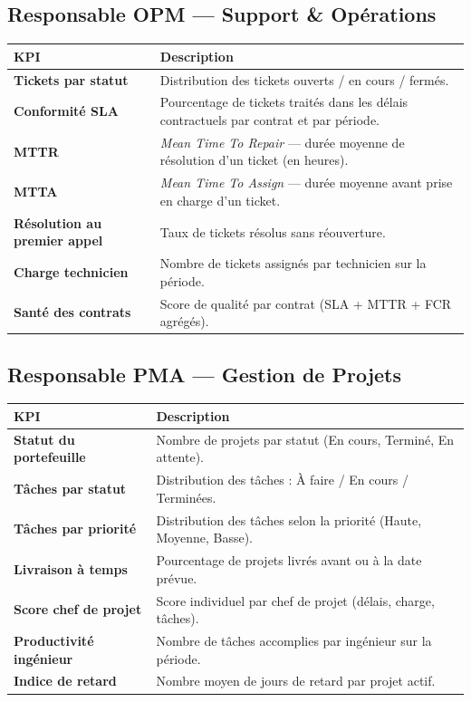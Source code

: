 \documentclass[a4paper,12pt]{article}
\begin{document}
\subsection{Responsable OPM — Support \& Opérations}

\begin{longtable}{>{\bfseries}p{5cm} p{9.5cm}}
\toprule
KPI & Description \\
\midrule
\endhead
Tickets par statut            & Distribution des tickets ouverts / en cours / fermés. \\
Conformité SLA                & Pourcentage de tickets traités dans les délais contractuels
                                 par contrat et par période. \\
MTTR                          & \textit{Mean Time To Repair} — durée moyenne de résolution
                                 d'un ticket (en heures). \\
MTTA                          & \textit{Mean Time To Assign} — durée moyenne avant
                                 prise en charge d'un ticket. \\
Résolution au premier appel   & Taux de tickets résolus sans réouverture. \\
Charge technicien             & Nombre de tickets assignés par technicien sur la période. \\
Santé des contrats            & Score de qualité par contrat (SLA + MTTR + FCR agrégés). \\
\bottomrule
\end{longtable}

\subsection{Responsable PMA — Gestion de Projets}

\begin{longtable}{>{\bfseries}p{5cm} p{9.5cm}}
\toprule
KPI & Description \\
\midrule
\endhead
Statut du portefeuille        & Nombre de projets par statut (En cours, Terminé, En attente). \\
Tâches par statut             & Distribution des tâches : À faire / En cours / Terminées. \\
Tâches par priorité           & Distribution des tâches selon la priorité (Haute, Moyenne, Basse). \\
Livraison à temps             & Pourcentage de projets livrés avant ou à la date prévue. \\
Score chef de projet          & Score individuel par chef de projet (délais, charge, tâches). \\
Productivité ingénieur        & Nombre de tâches accomplies par ingénieur sur la période. \\
Indice de retard              & Nombre moyen de jours de retard par projet actif. \\
\bottomrule
\end{longtable}
\end{document}
